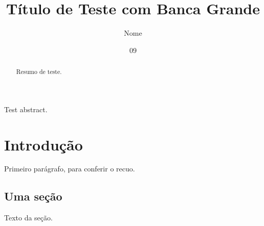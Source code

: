 \documentclass[dsc]{ufrj}
\title{Título de Teste com Banca Grande}
\author{Nome}{de Teste}
\date{09}{2026}
\begin{document}
  \maketitle
  \frontmatter
  \begin{abstract}
    Resumo de teste.
  \end{abstract}
  \begin{foreignabstract}
    Test abstract.
  \end{foreignabstract}
  \tableofcontents
  \mainmatter
  \chapter{Introdução}
    Primeiro parágrafo, para conferir o recuo.
  \section{Uma seção}
    Texto da seção.
\end{document}
